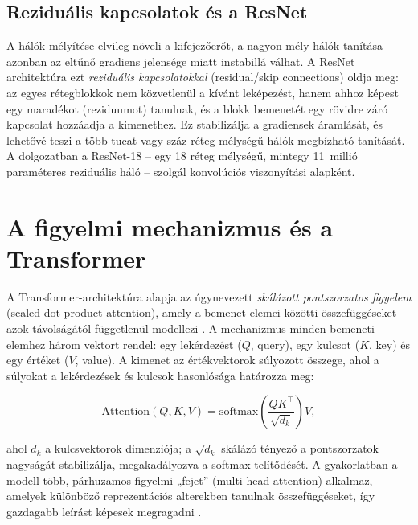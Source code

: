 \subsection{Reziduális kapcsolatok és a ResNet}

A hálók mélyítése elvileg növeli a kifejezőerőt, a nagyon mély hálók tanítása
azonban az eltűnő gradiens jelensége miatt instabillá válhat. A ResNet
architektúra \cite{he2016resnet} ezt \textit{reziduális kapcsolatokkal}
(residual/skip connections) oldja meg: az egyes rétegblokkok nem közvetlenül a
kívánt leképezést, hanem ahhoz képest egy maradékot (reziduumot) tanulnak, és a
blokk bemenetét egy rövidre záró kapcsolat hozzáadja a kimenethez. Ez stabilizálja
a gradiensek áramlását, és lehetővé teszi a több tucat vagy száz réteg mélységű
hálók megbízható tanítását. A dolgozatban a ResNet-18 -- egy 18 réteg mélységű,
mintegy 11~millió paraméteres reziduális háló -- szolgál konvolúciós viszonyítási
alapként.

\section{A figyelmi mechanizmus és a Transformer}

A Transformer-architektúra alapja az úgynevezett \textit{skálázott pontszorzatos
figyelem} (scaled dot-product attention), amely a bemenet elemei közötti
összefüggéseket azok távolságától függetlenül modellezi \cite{vaswani2017attention}.
A mechanizmus minden bemeneti elemhez három vektort rendel: egy lekérdezést
($Q$, query), egy kulcsot ($K$, key) és egy értéket ($V$, value). A kimenet az
értékvektorok súlyozott összege, ahol a súlyokat a lekérdezések és kulcsok
hasonlósága határozza meg:

\begin{equation}
  \mathrm{Attention}(Q, K, V) = \mathrm{softmax}\!\left(\frac{QK^{\top}}{\sqrt{d_k}}\right) V,
  \label{eq:attention}
\end{equation}

ahol $d_k$ a kulcsvektorok dimenziója; a $\sqrt{d_k}$ skálázó tényező a
pontszorzatok nagyságát stabilizálja, megakadályozva a softmax telítődését. A
gyakorlatban a modell több, párhuzamos figyelmi „fejet'' (multi-head attention)
alkalmaz, amelyek különböző reprezentációs alterekben tanulnak összefüggéseket,
így gazdagabb leírást képesek megragadni \cite{vaswani2017attention}.

